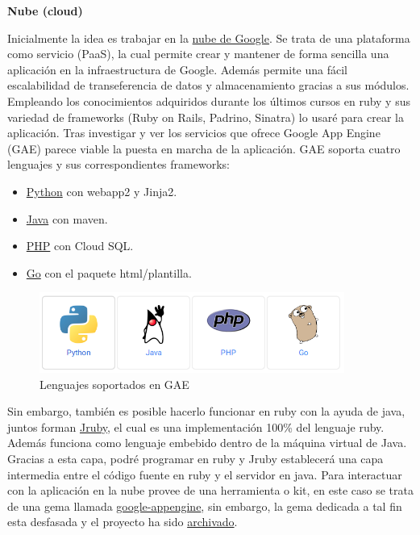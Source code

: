 \vspace*{0.3in}
\begin{LARGE}
	\textbf{{\huge Nube (cloud)}}
\end{LARGE}

\vspace*{0.1in}
Inicialmente la idea es trabajar en la \href{https://cloud.google.com/appengine/docs}{nube de Google}. Se trata de una plataforma como servicio (PaaS), la cual permite crear y mantener de forma sencilla una aplicación en la infraestructura de Google. Además permite una fácil escalabilidad de transeferencia de datos y almacenamiento gracias a sus módulos.\\

Empleando los conocimientos adquiridos durante los últimos cursos en ruby y sus variedad de frameworks (Ruby on Rails, Padrino, Sinatra) lo usaré para crear la aplicación. Tras investigar y ver los servicios que ofrece Google App Engine (GAE) parece viable la puesta en marcha de la aplicación. GAE soporta cuatro lenguajes y sus correspondientes frameworks:
\begin{itemize}
	\item \href{https://cloud.google.com/appengine/docs/python/gettingstartedpython27/introduction}{Python} con webapp2 y Jinja2.
	\item \href{https://cloud.google.com/appengine/docs/java/gettingstarted/introduction}{Java} con maven.
	\item \href{https://cloud.google.com/appengine/docs/php/gettingstarted/introduction}{PHP} con Cloud SQL.
	\item \href{https://cloud.google.com/appengine/docs/go/gettingstarted/introduction}{Go} con el paquete html/plantilla. 
\end{itemize}

\begin{figure}[H]
	\centering
		\includegraphics[width=10cm]{./images/lenguajes-GAE.png}
		\caption{Lenguajes soportados en GAE} \label{fig:lenguajes-GAE}
\end{figure}

Sin embargo, también es posible hacerlo funcionar en ruby con la ayuda de java, juntos forman \href{http://jruby.org/}{Jruby}, el cual es una implementación 100\% del lenguaje ruby. Además funciona como lenguaje embebido dentro de la máquina virtual de Java. Gracias a esta capa, podré programar en ruby y Jruby establecerá una capa intermedia entre el código fuente en ruby y el servidor en java. Para interactuar con la aplicación en la nube provee de una herramienta o kit, en este caso se trata de una gema llamada \href{https://rubygems.org/gems/google-appengine}{google-appengine}, sin embargo, la gema
dedicada a tal fin esta desfasada y el proyecto ha sido \href{https://code.google.com/p/appengine-jruby/}{archivado}.\\

